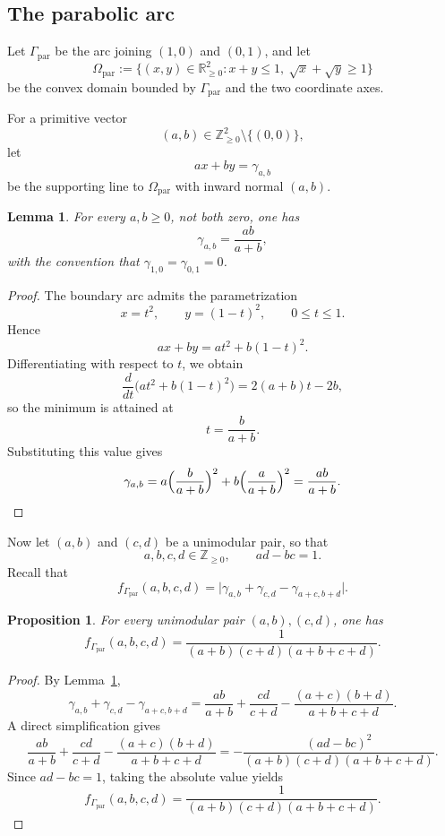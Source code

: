 \documentclass[a4paper,american,11pt]{amsart}
\theoremstyle{plain}
\newtheorem{proposition}[theorem]{Proposition}
\newtheorem{lemma}[theorem]{Lemma}
\theoremstyle{definition}
\newcommand{\Z}{\mathbb Z}
\newcommand{\R}{\mathbb R}
\begin{document}
\subsection{The parabolic arc}

Let \(\Gamma_{\mathrm{par}}\) be the arc joining \((1,0)\) and \((0,1)\), and
let
\[
\Omega_{\mathrm{par}}
:=
\{(x,y)\in \R_{\ge0}^2:x+y\le 1,\ \sqrt{x}+\sqrt{y}\ge 1\}
\]
be the convex domain bounded by \(\Gamma_{\mathrm{par}}\) and the two
coordinate axes.

For a primitive vector
\[
(a,b)\in \Z_{\ge0}^2\setminus\{(0,0)\},
\]
let
\[
ax+by=\gamma_{a,b}
\]
be the supporting line to \(\Omega_{\mathrm{par}}\) with inward normal
\((a,b)\).

\begin{lemma}\label{lem:parabola-support}
For every \(a,b\ge 0\), not both zero, one has
\[
\gamma_{a,b}=\frac{ab}{a+b},
\]
with the convention that \(\gamma_{1,0}=\gamma_{0,1}=0\).
\end{lemma}

\begin{proof}
The boundary arc admits the parametrization
\[
x=t^2,\qquad y=(1-t)^2,\qquad 0\le t\le 1.
\]
Hence
\[
ax+by=a t^2+b(1-t)^2.
\]
Differentiating with respect to \(t\), we obtain
\[
\frac{d}{dt}\bigl(a t^2+b(1-t)^2\bigr)=2(a+b)t-2b,
\]
so the minimum is attained at
\[
t=\frac{b}{a+b}.
\]
Substituting this value gives
\[
\gamma_{a,b}
=
a\Bigl(\frac{b}{a+b}\Bigr)^2
+
b\Bigl(\frac{a}{a+b}\Bigr)^2
=
\frac{ab}{a+b}.
\]
\end{proof}

Now let \((a,b)\) and \((c,d)\) be a unimodular pair, so that
\[
a,b,c,d\in \Z_{\ge0},
\qquad
ad-bc=1.
\]
Recall that
\[
f_{\Gamma_{\mathrm{par}}}(a,b,c,d)
=
\bigl|\gamma_{a,b}+\gamma_{c,d}-\gamma_{a+c,b+d}\bigr|.
\]

\begin{proposition}\label{prop:parabola-defect}
For every unimodular pair \((a,b),(c,d)\), one has
\[
f_{\Gamma_{\mathrm{par}}}(a,b,c,d)
=
\frac{1}{(a+b)(c+d)(a+b+c+d)}.
\]
\end{proposition}

\begin{proof}
By Lemma~\ref{lem:parabola-support},
\[
\gamma_{a,b}+\gamma_{c,d}-\gamma_{a+c,b+d}
=
\frac{ab}{a+b}+\frac{cd}{c+d}
-\frac{(a+c)(b+d)}{a+b+c+d}.
\]
A direct simplification gives
\[
\frac{ab}{a+b}+\frac{cd}{c+d}
-\frac{(a+c)(b+d)}{a+b+c+d}
=
-\frac{(ad-bc)^2}{(a+b)(c+d)(a+b+c+d)}.
\]
Since \(ad-bc=1\), taking the absolute value yields
\[
f_{\Gamma_{\mathrm{par}}}(a,b,c,d)
=
\frac{1}{(a+b)(c+d)(a+b+c+d)}.
\]
\end{proof}
\end{document}
